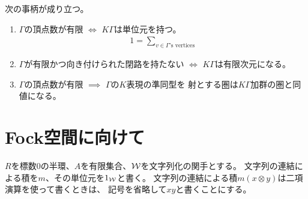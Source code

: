 	\begin{proposition}[有限頂点の場合に成り立つ事柄]\label{prop:有限頂点の場合に成り立つ事柄} %
		次の事柄が成り立つ。
		\begin{enumerate}\setlength{\itemsep}{-1mm} %
			\item $\Gamma$の頂点数が有限 $\iff$ $K\Gamma$は単位元を持つ。
			\begin{equation*}\begin{split} %
				1 = \sum_{v\in\Gamma\text{'s vertices}}
			\end{split}\end{equation*} %
			\item $\Gamma$が有限かつ向き付けられた閉路を持たない $\iff$ 
			$K\Gamma$は有限次元になる。
			\item $\Gamma$の頂点数が有限 $\implies$ $\Gamma$の$K$表現の準同型を
			射とする圏は$K\Gamma$加群の圏と同値になる。
		\end{enumerate} %
	\end{proposition} %

%
\section{Fock空間に向けて}\label{s1:Fock空間に向けて} %
	$R$を標数$0$の半環、$A$を有限集合、$\mathcal{W}$を文字列化の関手とする。
	文字列の連結による積を$m$、その単位元を$1_{\mathcal{W}}$と書く。
	文字列の連結による積$m(x\otimes y)$は二項演算を使って書くときは、
	記号を省略して$xy$と書くことにする。

